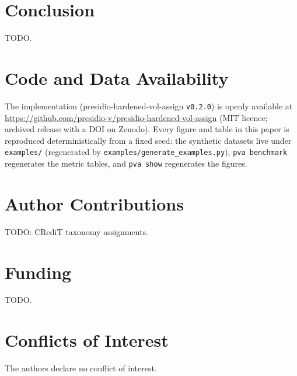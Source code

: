 \section{Conclusion}
\label{sec:conclusion}

%
%

TODO.

\section*{Code and Data Availability}
The implementation (presidio-hardened-vol-assign \texttt{v0.2.0}) is openly
available at \url{https://github.com/presidio-v/presidio-hardened-vol-assign}
(MIT licence; archived release with a DOI on Zenodo). Every figure and table in
this paper is reproduced deterministically from a fixed seed: the synthetic
datasets live under \texttt{examples/} (regenerated by
\texttt{examples/generate\_examples.py}), \texttt{pva benchmark} regenerates the
metric tables, and \texttt{pva show} regenerates the figures.

\section*{Author Contributions}
TODO: CRediT taxonomy assignments.

\section*{Funding}
TODO.

\section*{Conflicts of Interest}
The authors declare no conflict of interest.
